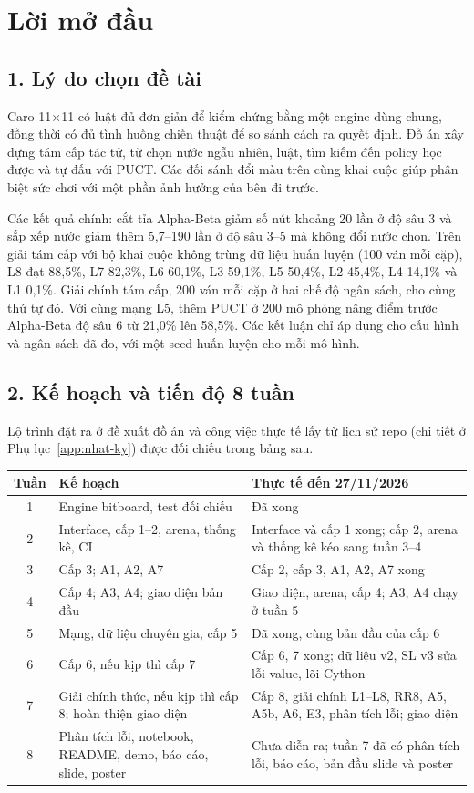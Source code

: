 \chapter*{Lời mở đầu}
\label{ch:loi-mo-dau}

\section*{1. Lý do chọn đề tài}
Caro 11×11 có luật đủ đơn giản để kiểm chứng bằng một engine dùng chung, đồng thời có đủ tình huống chiến thuật để so sánh cách ra quyết định. Đồ án xây dựng tám cấp tác tử, từ chọn nước ngẫu nhiên, luật, tìm kiếm đến policy học được và tự đấu với PUCT. Các đối sánh đổi màu trên cùng khai cuộc giúp phân biệt sức chơi với một phần ảnh hưởng của bên đi trước.

Các kết quả chính: cắt tỉa Alpha-Beta giảm số nút khoảng 20 lần ở độ sâu 3 và sắp xếp nước giảm thêm 5,7--190 lần ở độ sâu 3--5 mà không đổi nước chọn. Trên giải tám cấp với bộ khai cuộc không trùng dữ liệu huấn luyện (100 ván mỗi cặp), L8 đạt 88,5\%, L7 82,3\%, L6 60,1\%, L3 59,1\%, L5 50,4\%, L2 45,4\%, L4 14,1\% và L1 0,1\%. Giải chính tám cấp, 200 ván mỗi cặp ở hai chế độ ngân sách, cho cùng thứ tự đó. Với cùng mạng L5, thêm PUCT ở 200 mô phỏng nâng điểm trước Alpha-Beta độ sâu 6 từ 21,0\% lên 58,5\%. Các kết luận chỉ áp dụng cho cấu hình và ngân sách đã đo, với một seed huấn luyện cho mỗi mô hình.

\section*{2. Kế hoạch và tiến độ 8 tuần}
Lộ trình đặt ra ở đề xuất đồ án và công việc thực tế lấy từ lịch sử repo (chi tiết ở Phụ lục~\ref{app:nhat-ky}) được đối chiếu trong bảng sau.

{\small\noindent
\begin{tabularx}{\textwidth}{@{}c >{\raggedright\arraybackslash}X >{\raggedright\arraybackslash}X@{}}
\toprule
\textbf{Tuần} & \textbf{Kế hoạch} & \textbf{Thực tế đến 27/11/2026} \\
\midrule
1 & Engine bitboard, test đối chiếu & Đã xong \\
2 & Interface, cấp 1--2, arena, thống kê, CI & Interface và cấp 1 xong; cấp 2, arena và thống kê kéo sang tuần 3--4 \\
3 & Cấp 3; A1, A2, A7 & Cấp 2, cấp 3, A1, A2, A7 xong \\
4 & Cấp 4; A3, A4; giao diện bản đầu & Giao diện, arena, cấp 4; A3, A4 chạy ở tuần 5 \\
5 & Mạng, dữ liệu chuyên gia, cấp 5 & Đã xong, cùng bản đầu của cấp 6 \\
6 & Cấp 6, nếu kịp thì cấp 7 & Cấp 6, 7 xong; dữ liệu v2, SL v3 sửa lỗi value, lõi Cython \\
7 & Giải chính thức, nếu kịp thì cấp 8; hoàn thiện giao diện & Cấp 8, giải chính L1--L8, RR8, A5, A5b, A6, E3, phân tích lỗi; giao diện \\
8 & Phân tích lỗi, notebook, README, demo, báo cáo, slide, poster & Chưa diễn ra; tuần 7 đã có phân tích lỗi, báo cáo, bản đầu slide và poster \\
\bottomrule
\end{tabularx}}

